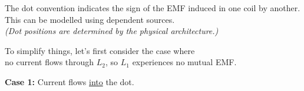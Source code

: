 \begin{multicols}{2}

    \begin{CheatsheetEntryFrame}



        The dot convention indicates the sign of the EMF induced in one coil by another. This can be modelled using dependent sources. \\[0mm]
        {\scriptsize \textit{(Dot positions are determined by the physical architecture.)}}

        To simplify things, let's first consider the case where \\[0mm]
        {\color{myred} no current flows through $L_2$}, so {\color{myred} $L_1$ experiences no mutual EMF}.

        \medskip

        \textbf{Case 1:} Current flows \ul{into} the dot.


\end{CheatsheetEntryFrame}
\end{multicols}
